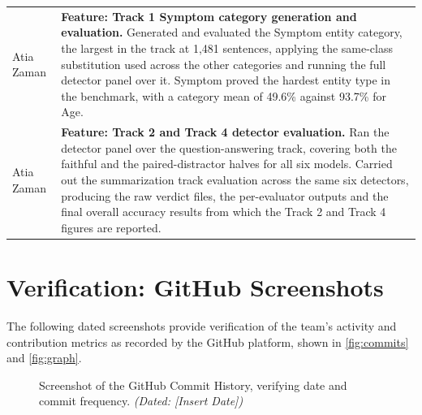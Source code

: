 \documentclass{iutbscthesis}
\begin{document}
\begin{appendices}
\begin{longtable}{|>{\centering\arraybackslash}m{3.0cm}|p{10.2cm}|}
\multicolumn{2}{|l|}{\textbf{Atia Zaman} \quad \small 220041241} \\
\hline
Atia Zaman &
\textbf{Feature: Track 1 Symptom category generation and evaluation.}
Generated and evaluated the Symptom entity category, the largest in the track at
1,481 sentences, applying the same-class substitution used across the other
categories and running the full detector panel over it. Symptom proved the
hardest entity type in the benchmark, with a category mean of 49.6\% against
93.7\% for Age. \\
\hline
Atia Zaman &
\textbf{Feature: Track 2 and Track 4 detector evaluation.}
Ran the detector panel over the question-answering track, covering both the
faithful and the paired-distractor halves for all six models. Carried out the
summarization track evaluation across the same six detectors, producing the raw
verdict files, the per-evaluator outputs and the final overall accuracy results
from which the Track 2 and Track 4 figures are reported. \\
\hline
\end{longtable}
\normalsize

\section{Verification: GitHub Screenshots}

The following dated screenshots provide verification of the team's activity and
contribution metrics as recorded by the GitHub platform, shown in
\autoref{fig:commits} and \autoref{fig:graph}.

\begin{figure}[H]
    \centering
    \caption{Screenshot of the GitHub Commit History, verifying date and commit frequency. \textit{(Dated: [Insert Date])}}
    \label{fig:commits}
\end{figure}


\end{appendices}
\end{document}

